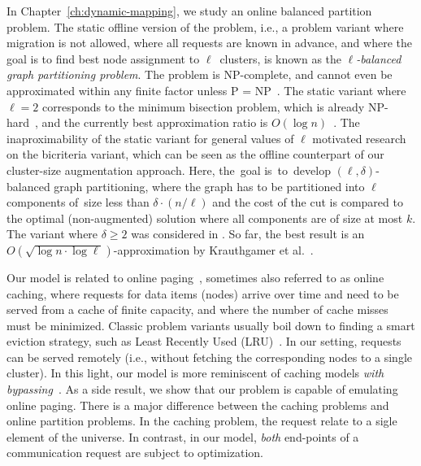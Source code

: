 In Chapter~\ref{ch:dynamic-mapping}, we study an online balanced partition problem.
The static offline version of the problem, i.e., a problem variant where
migration is not allowed, where all requests are known in advance, and where
the goal is to find best node assignment to $\ell$~clusters, is known as the
\emph{$\ell$-balanced graph partitioning problem}. The problem is 
NP-complete, and cannot even be approximated within any finite factor unless P
= NP~\cite{AndRae06}.  The static
variant where $\ell = 2$ corresponds to the minimum bisection problem, which
is already NP-hard~\cite{GaJoSt76}, and 
the currently best approximation ratio is $O(\log n)$~\cite{SarVaz95,ArKaKa99,FeKrNi00,FeiKra02,KraFei06,Raec08}.
The inaproximability of the static variant for general values of $\ell$
motivated research on the bicriteria variant, which can be seen as the offline
counterpart of our cluster-size augmentation approach. Here, the~goal
is~to~develop $(\ell,\delta)$-balanced graph partitioning, where the graph has
to be partitioned into $\ell$ components of~size less than $\delta \cdot (n /
\ell)$ and the cost of the cut is compared to the optimal (non-augmented)
solution where all components are of size at most $k$. The variant where
$\delta \geq 2$ was considered in
\cite{LeMaTr90,SimTen97,EvNaRS00,EvNaRS99,KrNaSc09}. So far, the best result is
an $O(\!\sqrt{\log n \cdot \log \ell})$-approximation by Krauthgamer et
al.~\cite{KrNaSc09}.

Our model is related to online
paging~\cite{SleTar85,FKLMSY91,McGSle91,AcChNo00}, sometimes also referred to
as online caching, where requests for data items (nodes) arrive over time and
need to be served from a cache of finite capacity, and where the number of
cache misses must be minimized. Classic problem variants usually boil down to
finding a smart eviction strategy, such as Least Recently Used (LRU)~\cite{competitive-analysis}. In our
setting, requests can be served remotely (i.e., without fetching the
corresponding nodes to a single cluster). In this light, our model is more
reminiscent of caching models \emph{with
bypassing}~\cite{EpImLN11,EpImLN15,Irani02}. As a side result, we show that our problem is
capable of emulating online paging.
There is a major difference between the caching problems and online partition problems.
In the caching problem, the request relate to a sigle element of the universe.
In contrast, in our model,
\emph{both} end-points of a communication request are subject to optimization.



